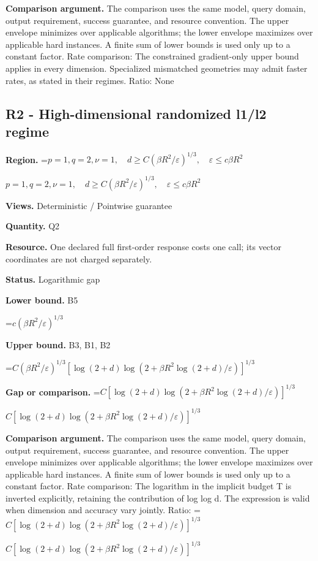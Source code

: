 \documentclass[10pt,a4paper]{article}
\newcommand{\AtlasMath}[1]{\par\begingroup\centering\setbox0=\hbox{$\displaystyle #1$}\ifdim\wd0>1.4\linewidth\typeout{ATLAS WIDE FORMULA: \the\wd0}\fi\ifdim\wd0>\linewidth\resizebox{\linewidth}{!}{\box0}\else\box0\fi\par\endgroup}
\newcommand{\AtlasInlineMath}[1]{\begingroup\setbox0=\hbox{$#1$}\ifdim\wd0>.4\linewidth\endgroup\AtlasMath{#1}\else\endgroup$#1$\fi}
\begin{document}
\textbf{Comparison argument.} The comparison uses the same model, query domain, output requirement, success guarantee, and resource convention. The upper envelope minimizes over applicable algorithms; the lower envelope maximizes over applicable hard instances. A finite sum of lower bounds is used only up to a constant factor. Rate comparison: The constrained gradient-only upper bound applies in every dimension. Specialized mismatched geometries may admit faster rates, as stated in their regimes. Ratio: None



\subsection{R2 - High-dimensional randomized l1/l2 regime}


\textbf{Region.} \AtlasInlineMath{p=1,q=2,\nu=1,\quad d\ge C(\beta R^2/\varepsilon)^{1/3},\quad\varepsilon\le c\beta R^2}



\textbf{Views.} Deterministic / Pointwise guarantee



\textbf{Quantity.} Q2



\textbf{Resource.} One declared full first-order response costs one call; its vector coordinates are not charged separately.



\textbf{Status.} Logarithmic gap



\textbf{Lower bound.} B5



\AtlasMath{c(\beta R^2/\varepsilon)^{1/3}}


\textbf{Upper bound.} B3, B1, B2



\AtlasMath{C(\beta R^2/\varepsilon)^{1/3}[\log(2+d)\log(2+\beta R^2\log(2+d)/\varepsilon)]^{1/3}}


\textbf{Gap or comparison.} \AtlasInlineMath{C[\log(2+d)\log(2+\beta R^2\log(2+d)/\varepsilon)]^{1/3}}



\textbf{Comparison argument.} The comparison uses the same model, query domain, output requirement, success guarantee, and resource convention. The upper envelope minimizes over applicable algorithms; the lower envelope maximizes over applicable hard instances. A finite sum of lower bounds is used only up to a constant factor. Rate comparison: The logarithm in the implicit budget T is inverted explicitly, retaining the contribution of log log d. The expression is valid when dimension and accuracy vary jointly. Ratio: \AtlasInlineMath{C[\log(2+d)\log(2+\beta R^2\log(2+d)/\varepsilon)]^{1/3}}
\end{document}
